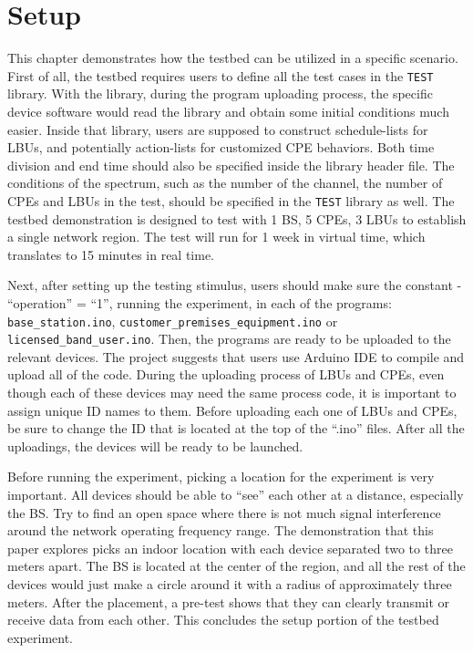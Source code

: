\section{Setup}

This chapter demonstrates how the testbed can be utilized in a specific scenario. First of all, the testbed requires users to define all the test cases in the \texttt{TEST} library. With the library, during the program uploading process, the specific device software would read the library and obtain some initial conditions much easier. Inside that library, users are supposed to construct schedule-lists for LBUs, and potentially action-lists for customized CPE behaviors. Both time division and end time should also be specified inside the library header file. The conditions of the spectrum, such as the number of the channel, the number of CPEs and LBUs in the test, should be specified in the \texttt{TEST} library as well. The testbed demonstration is designed to test with 1 BS, 5 CPEs, 3 LBUs to establish a single network region. The test will run for 1 week in virtual time, which translates to 15 minutes in real time.

Next, after setting up the testing stimulus, users should make sure the constant - ``operation'' = ``1'', running the experiment, in each of the programs: \texttt{base\_station.ino}, \texttt{customer\_premises\_equipment.ino} or \texttt{licensed\_band\_user.ino}. Then, the programs are ready to be uploaded to the relevant devices. The project suggests that users use Arduino IDE to compile and upload all of the code. During the uploading process of LBUs and CPEs, even though each of these devices may need the same process code, it is important to assign unique ID names to them. Before uploading each one of LBUs and CPEs, be sure to change the ID that is located at the top of the ``.ino'' files. After all the uploadings, the devices will be ready to be launched. 

Before running the experiment, picking a location for the experiment is very important. All devices should be able to ``see'' each other at a distance, especially the BS. Try to find an open space where there is not much signal interference around the network operating frequency range. The demonstration that this paper explores picks an indoor location with each device separated two to three meters apart. The BS is located at the center of the region, and all the rest of the devices would just make a circle around it with a radius of approximately three meters. After the placement, a pre-test shows that they can clearly transmit or receive data from each other. This concludes the setup portion of the testbed experiment.


